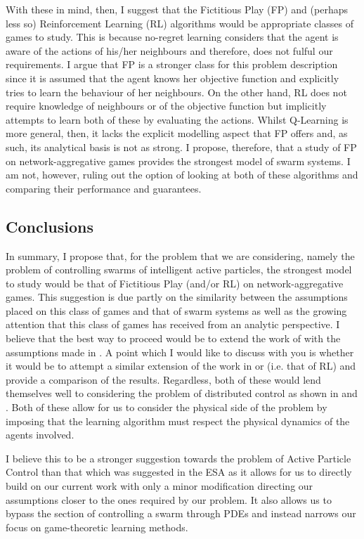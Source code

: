 \documentclass{article}
\begin{document}
With these in mind, then, I suggest that the Fictitious Play (FP) and (perhaps less so)
Reinforcement Learning (RL) algorithms would be appropriate classes of games to study. This is
because no-regret learning considers that the agent is aware of the actions of his/her neighbours
and therefore, does not fulful our requirements. I argue that FP is a stronger class for this
problem description since it is assumed that the agent knows her objective function and explicitly
tries to learn the behaviour of her neighbours. On the other hand, RL does not require knowledge of
neighbours or of the objective function but implicitly attempts to learn both of these by evaluating
the actions. Whilst Q-Learning is more general, then, it lacks the explicit modelling aspect that FP
offers and, as such, its analytical basis is not as strong. I propose, therefore, that a study of FP
on network-aggregative games provides the strongest model of swarm systems. I am not, however,
ruling out the option of looking at both of these algorithms and comparing their performance and
guarantees.


\subsection*{Conclusions} 

In summary, I propose that, for the problem that we are considering, namely the problem of
controlling swarms of intelligent active particles, the strongest model to study would be that of
Fictitious Play (and/or RL) on network-aggregative games. This suggestion is due partly on the
similarity between the assumptions placed on this class of games and that of swarm systems as well
as the growing attention that this class of games has received from an analytic perspective. I
believe that the best way to proceed would be to extend the work of \cite{Ewerhart2019} with the
assumptions made in \cite{Parise}. A point which I would like to discuss with you is whether it would
be to attempt a similar extension of the work in \cite{Li2017} or \cite{Vamvoudakis2017}
(i.e. that of RL) and provide a comparison of the results. Regardless, both of these would lend
themselves well to considering the problem of distributed control as shown in 
\cite{Vamvoudakis2017} and \cite{Bianchi, DePersis2020}. Both of these allow for us to
consider the physical side of the problem by imposing that the learning algorithm must respect the
physical dynamics of the agents involved. 

I believe this to be a stronger suggestion towards the problem of Active Particle Control than that
which was suggested in the ESA as it allows for us to directly build on our current work with only a
minor modification directing our assumptions closer to the ones required by our problem. It also
allows us to bypass the section of controlling a swarm through PDEs and instead narrows our focus on
game-theoretic learning methods. 

 


\end{document}
